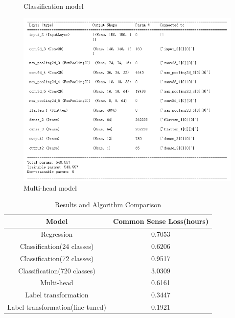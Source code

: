 \documentclass{article}
\begin{document}
\begin{figure}[!h]
\begin{minipage}[t]{0.3\textwidth}
		\caption{Classification model}
		\label{fig:classification}
	\end{minipage}
	\begin{minipage}[t]{0.3\textwidth}%
		\centering
		\includegraphics[width=\textwidth]{multi-head.png}
		\caption{Multi-head model}
		\label{fig:multi-head}
	\end{minipage}
\end{figure}
    \begin{table}[!ht]
	\caption{Results and Algorithm Comparison}
	\label{tab:performance}
	\centering
	\begin{tabular}{cc}
		\toprule
		\textbf{Model} & \textbf{Common Sense Loss(hours)} \\
		\midrule
		Regression & 0.7053 \\
		Classification(24 classes) & 0.6206 \\
		Classification(72 classes) & 0.9517 \\
		Classification(720 classes) & 3.0309 \\
		Multi-head & 0.6161 \\
		Label transformation & 0.3447 \\
		Label transformation(fine-tuned) & 0.1921 \\
		\bottomrule
	\end{tabular}
\end{table}
\end{document}
